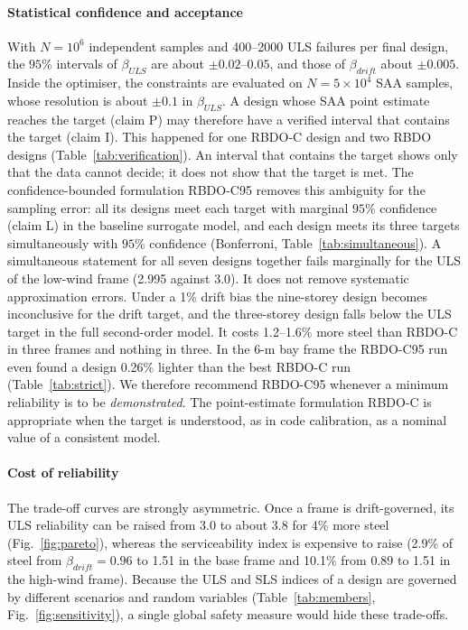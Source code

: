 \paragraph{Statistical confidence and acceptance}
With $N=10^6$ independent samples and 400--2000 ULS failures per final design, the $95\%$ intervals
of $\beta_{ULS}$ are about $\pm0.02$--$0.05$, and those of $\beta_{drift}$ about $\pm0.005$. Inside the
optimiser, the constraints are evaluated on $N=5\times10^4$ SAA samples, whose resolution is about
$\pm0.1$ in $\beta_{ULS}$. A design whose SAA point estimate reaches the target (claim P) may
therefore have a verified interval that contains the target (claim I). This happened for one RBDO-C
design and two RBDO designs (Table~\ref{tab:verification}). An interval that contains the target
shows only that the data cannot decide; it does not show that the target is met. The
confidence-bounded formulation RBDO-C95 removes this ambiguity for the sampling error: all its
designs meet each target with marginal $95\%$ confidence (claim L) in the baseline surrogate model,
and each design meets its three targets simultaneously with $95\%$ confidence (Bonferroni,
Table~\ref{tab:simultaneous}). A simultaneous statement for all seven designs together fails
marginally for the ULS of the low-wind frame (2.995 against 3.0). It does not
remove systematic approximation errors. Under a 1\% drift bias the nine-storey design becomes
inconclusive for the drift target, and the three-storey design falls below the ULS target in the full
second-order model. It costs 1.2--1.6\% more steel than RBDO-C in three
frames and nothing in three. In the 6-m bay frame the RBDO-C95 run even found a design 0.26\%
lighter than the best RBDO-C run (Table~\ref{tab:strict}). We therefore recommend RBDO-C95 whenever
a minimum reliability is to be \emph{demonstrated}. The point-estimate formulation RBDO-C is
appropriate when the target is understood, as in code calibration, as a nominal value of a
consistent model.

\paragraph{Cost of reliability}
The trade-off curves are strongly asymmetric. Once a frame is drift-governed, its ULS reliability
can be raised from 3.0 to about 3.8 for 4\% more steel (Fig.~\ref{fig:pareto}), whereas the
serviceability index is expensive to raise (2.9\% of steel from $\beta_{drift}=0.96$ to 1.51 in the
base frame and 10.1\% from 0.89 to 1.51 in the high-wind frame). Because the ULS and SLS indices
of a design are governed by different scenarios and random variables (Table~\ref{tab:members},
Fig.~\ref{fig:sensitivity}), a single global safety measure would hide these trade-offs.

